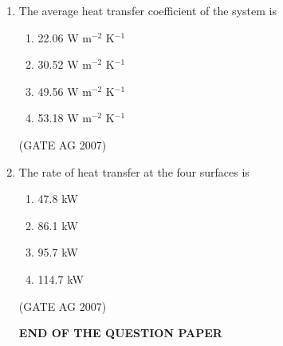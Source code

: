\documentclass[journal,12pt,onecolumn]{IEEEtran}
\theoremstyle{remark}
\begin{document}
\begin{enumerate}
\item The average heat transfer coefficient of the system is
\begin{multicols}{4}
\begin{enumerate}
\item 22.06 W m$^{-2}$ K$^{-1}$
\item 30.52 W m$^{-2}$ K$^{-1}$
\item 49.56 W m$^{-2}$ K$^{-1}$
\item 53.18 W m$^{-2}$ K$^{-1}$
\end{enumerate}
\end{multicols}
\hfill(GATE AG 2007)


\item The rate of heat transfer at the four surfaces is

\begin{multicols}{4}
\begin{enumerate}
\item 47.8 kW
\item 86.1 kW
\item 95.7 kW
\item 114.7 kW
\end{enumerate}
\end{multicols}
\hfill(GATE AG 2007)



\begin{center}
\textbf{END OF THE QUESTION PAPER}
\end{center}

\end{enumerate}
\end{document}
